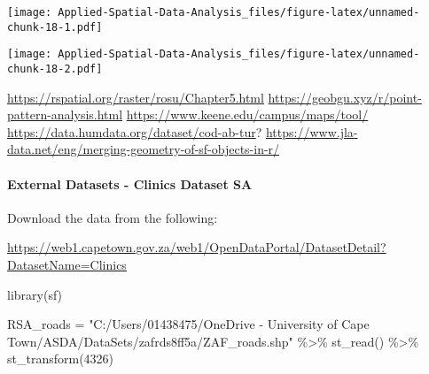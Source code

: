 \documentclass[
]{book}
\newenvironment{Shaded}{\begin{snugshade}}{\end{snugshade}}
\newcommand{\AttributeTok}[1]{\textcolor[rgb]{0.77,0.63,0.00}{#1}}
\newcommand{\ConstantTok}[1]{\textcolor[rgb]{0.00,0.00,0.00}{#1}}
\newcommand{\DecValTok}[1]{\textcolor[rgb]{0.00,0.00,0.81}{#1}}
\newcommand{\FloatTok}[1]{\textcolor[rgb]{0.00,0.00,0.81}{#1}}
\newcommand{\FunctionTok}[1]{\textcolor[rgb]{0.00,0.00,0.00}{#1}}
\newcommand{\NormalTok}[1]{#1}
\newcommand{\OtherTok}[1]{\textcolor[rgb]{0.56,0.35,0.01}{#1}}
\newcommand{\SpecialCharTok}[1]{\textcolor[rgb]{0.00,0.00,0.00}{#1}}
\newcommand{\StringTok}[1]{\textcolor[rgb]{0.31,0.60,0.02}{#1}}
\begin{document}
\texttt{[image: Applied-Spatial-Data-Analysis\_files/figure-latex/unnamed-chunk-18-1.pdf]}

\begin{Shaded}
\end{Shaded}

\texttt{[image: Applied-Spatial-Data-Analysis\_files/figure-latex/unnamed-chunk-18-2.pdf]}

\url{https://rspatial.org/raster/rosu/Chapter5.html}
\url{https://geobgu.xyz/r/point-pattern-analysis.html}
\url{https://www.keene.edu/campus/maps/tool/}
\url{https://data.humdata.org/dataset/cod-ab-tur}?
\url{https://www.jla-data.net/eng/merging-geometry-of-sf-objects-in-r/}

\hypertarget{external-datasets---clinics-dataset-sa}{%
\paragraph{External Datasets - Clinics Dataset SA}\label{external-datasets---clinics-dataset-sa}}

Download the data from the following:

\url{https://web1.capetown.gov.za/web1/OpenDataPortal/DatasetDetail?DatasetName=Clinics}

\begin{Shaded}
\begin{Highlighting}[]
\FunctionTok{library}\NormalTok{(sf)}

\NormalTok{RSA\_roads }\OtherTok{=} \StringTok{"C:/Users/01438475/OneDrive {-} University of Cape Town/ASDA/DataSets/zafrds8ff5a/ZAF\_roads.shp"} \SpecialCharTok{\%\textgreater{}\%} 
  \FunctionTok{st\_read}\NormalTok{() }\SpecialCharTok{\%\textgreater{}\%} \FunctionTok{st\_transform}\NormalTok{(}\DecValTok{4326}\NormalTok{)}
\end{Highlighting}
\end{Shaded}
\end{document}
